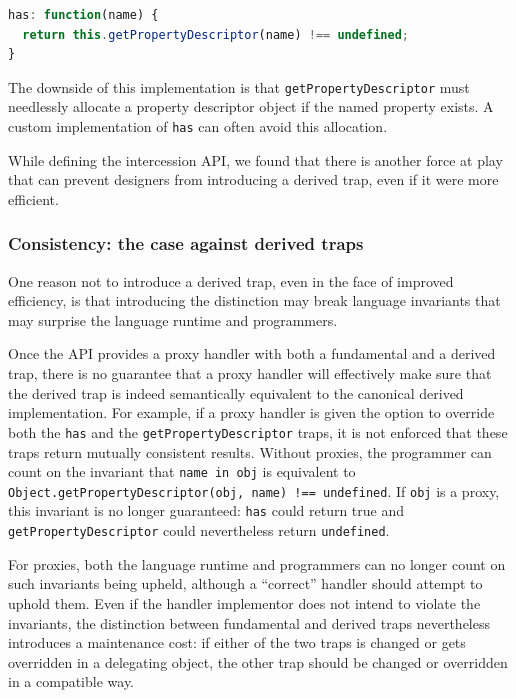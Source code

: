 \documentclass{sig-alternate}
\begin{document}
\begin{lstlisting}[language=javascript]
has: function(name) {
  return this.getPropertyDescriptor(name) !== undefined;
}
\end{lstlisting}

The downside of this implementation is that \texttt{getPropertyDescriptor} must needlessly allocate a property descriptor object if the named property exists. A custom implementation of \texttt{has} can often avoid this allocation.


While defining the intercession API, we found that there is another force at play that can prevent designers from introducing a derived trap, even if it were more efficient.

\subsubsection{Consistency: the case against derived traps}

One reason not to introduce a derived trap, even in the face of improved efficiency, is that introducing the distinction may break language invariants that may surprise the language runtime and programmers.

Once the API provides a proxy handler with both a fundamental and a derived trap, there is no guarantee that a proxy handler will effectively make sure that the derived trap is indeed semantically equivalent to the canonical derived implementation. For example, if a proxy handler is given the option to override both the \texttt{has} and the \texttt{getPropertyDescriptor} traps, it is not enforced that these traps return mutually consistent results. Without proxies, the programmer can count on the invariant that \texttt{name in obj} is equivalent to \texttt{Object.getPropertyDescriptor(obj, name) !== undefined}. If \texttt{obj} is a proxy, this invariant is no longer guaranteed: \texttt{has} could return true and \texttt{getPropertyDescriptor} could nevertheless return \texttt{undefined}.

For proxies, both the language runtime and programmers can no longer count on such invariants being upheld, although a ``correct'' handler should attempt to uphold them. Even if the handler implementor does not intend to violate the invariants, the distinction between fundamental and derived traps nevertheless introduces a maintenance cost: if either of the two traps is changed or gets overridden in a delegating object, the other trap should be changed or overridden in a compatible way.
\end{document}
